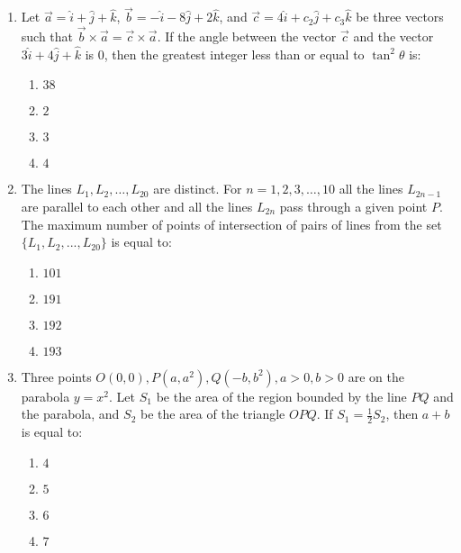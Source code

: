\documentclass[journal]{IEEEtran}
\begin{document}
\begin{enumerate}
    \item Let $\vec{a}=\hat{i}+\hat{j}+\hat{k}$, $\vec{b}=-\hat{i}-8\hat{j}+2\hat{k}$, and $\vec{c}=4\hat{i}+c_{2}\hat{j}+c_{3}\hat{k}$ be three vectors such that $\vec{b}\times\vec{a}=\vec{c}\times\vec{a}$. If the angle between the vector $\vec{c}$ and the vector $3\hat{i}+4\hat{j}+\hat{k}$ is $0$, then the greatest integer less than or equal to $\tan^{2}\theta$ is:

        \begin{multicols}{4}
        \begin{enumerate}
        \item $38$
        \item $2$
        \item $3$
        \item $4$
        \end{enumerate}
        \end{multicols}

    \item The lines $L_{1}, L_{2}, \ldots, L_{20}$ are distinct. For $n=1, 2, 3, \ldots, 10$ all the lines $L_{2n-1}$ are parallel to each other and all the lines $L_{2n}$ pass through a given point $P$. The maximum number of points of intersection of pairs of lines from the set $\{L_{1},L_{2},...,L_{20}\}$ is equal to:

        \begin{multicols}{4}
        \begin{enumerate}
        \item $101$
        \item $191$
        \item $192$
        \item $193$
        \end{enumerate}
        \end{multicols}

    \item Three points $O(0,0), P(a,a^{2}), Q(-b,b^{2}), a>0, b>0$ are on the parabola $y=x^{2}$. Let $S_{1}$ be the area of the region bounded by the line $PQ$ and the parabola, and $S_{2}$ be the area of the triangle $OPQ$. If $S_{1}=\frac{1}{2}S_{2}$, then $a+b$ is equal to:

        \begin{multicols}{4}
        \begin{enumerate}
        \item $4$
        \item $5$
        \item $6$
        \item $7$
        \end{enumerate}
        \end{multicols}

\end{enumerate}
\end{document}
